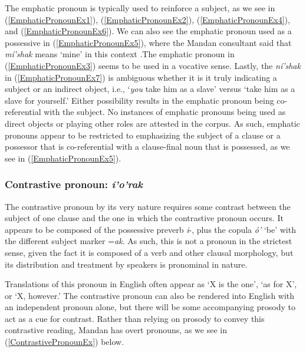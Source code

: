 The emphatic pronoun is typically used to reinforce a subject, as we see in (\ref{EmphaticPronounEx1}), (\ref{EmphaticPronounEx2}), (\ref{EmphaticPronounEx4}), and (\ref{EmphaticPronounEx6}). We can also see the emphatic pronoun used as a possessive in (\ref{EmphaticPronounEx5}), where the Mandan consultant said that \textit{mí'shak} means `mine' in this context .The emphatic pronoun in (\ref{EmphaticPronounEx3}) seems to be used in a vocative sense. Lastly, the \textit{ní'shak} in (\ref{EmphaticPronounEx7}) is ambiguous whether it is it truly indicating a subject or an indirect object, i.e., `\textit{you} take him as a slave' versus `take him as a slave for yourself.' Either possibility results in the emphatic pronoun being co-referential with the subject. No instances of emphatic pronouns being used as direct objects or playing other roles are attested in the corpus. As such, emphatic pronouns appear to be restricted to emphasizing the subject of a clause or a possessor that is co-referential with a clause-final noun that is possessed, as we see in (\ref{EmphaticPronounEx5}).

\subsubsection{Contrastive pronoun: \textit{í'o'rak}}\label{SubSubSecContrastivePronoun}

The contrastive pronoun by its very nature requires some contrast between the subject of one clause and the one in which the contrastive pronoun occurs. It appears to be composed of the possessive preverb \textit{i}-, plus the copula \textit{ó'} `be' with the different subject marker =\textit{ak}. As such, this is not a pronoun in the strictest sense, given the fact it is composed of a verb and other clausal morphology, but its distribution and treatment by speakers is pronominal in nature. 

Translations of this pronoun in English often appear as `X is the one', `as for X', or `X, however.' The contrastive pronoun can also be rendered into English with an independent pronoun alone, but there will be some accompanying prosody to act as a cue for contrast. Rather than relying on prosody to convey this contrastive reading, Mandan has overt pronouns, as we see in (\ref{ContrastivePronounEx}) below.

